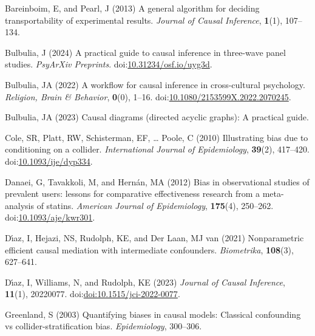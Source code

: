 \documentclass[
  single column]{article}
\newlength{\cslhangindent}
\newenvironment{CSLReferences}[2] %
 {\begin{list}{}{%
  \setlength{\itemindent}{0pt}
  \setlength{\leftmargin}{0pt}
  \setlength{\parsep}{0pt}
  \ifodd #1
   \setlength{\leftmargin}{\cslhangindent}
   \setlength{\itemindent}{-1\cslhangindent}
  \fi
  \setlength{\itemsep}{#2\baselineskip}}}
 {\end{list}}
\begin{document}
\label{refs}
\begin{CSLReferences}{1}{0}
Bareinboim, E, and Pearl, J (2013) A general algorithm for deciding
transportability of experimental results. \emph{Journal of Causal
Inference}, \textbf{1}(1), 107--134.

Bulbulia, J (2024) A practical guide to causal inference in three-wave
panel studies. \emph{PsyArXiv Preprints}.
doi:\href{https://doi.org/10.31234/osf.io/uyg3d}{10.31234/osf.io/uyg3d}.

Bulbulia, JA (2022) A workflow for causal inference in cross-cultural
psychology. \emph{Religion, Brain \& Behavior}, \textbf{0}(0), 1--16.
doi:\href{https://doi.org/10.1080/2153599X.2022.2070245}{10.1080/2153599X.2022.2070245}.

Bulbulia, JA (2023) Causal diagrams (directed acyclic graphs): A
practical guide.

Cole, SR, Platt, RW, Schisterman, EF, \ldots{} Poole, C (2010)
Illustrating bias due to conditioning on a collider. \emph{International
Journal of Epidemiology}, \textbf{39}(2), 417--420.
doi:\href{https://doi.org/10.1093/ije/dyp334}{10.1093/ije/dyp334}.

Danaei, G, Tavakkoli, M, and Hernán, MA (2012) Bias in observational
studies of prevalent users: lessons for comparative effectiveness
research from a meta-analysis of statins. \emph{American Journal of
Epidemiology}, \textbf{175}(4), 250--262.
doi:\href{https://doi.org/10.1093/aje/kwr301}{10.1093/aje/kwr301}.

Dı́az, I, Hejazi, NS, Rudolph, KE, and Der Laan, MJ van (2021)
Nonparametric efficient causal mediation with intermediate confounders.
\emph{Biometrika}, \textbf{108}(3), 627--641.

Dı́az, I, Williams, N, and Rudolph, KE (2023) \emph{Journal of Causal
Inference}, \textbf{11}(1), 20220077.
doi:\href{https://doi.org/doi:10.1515/jci-2022-0077}{doi:10.1515/jci-2022-0077}.

Greenland, S (2003) Quantifying biases in causal models: Classical
confounding vs collider-stratification bias. \emph{Epidemiology},
300--306.


\end{CSLReferences}
\end{document}
